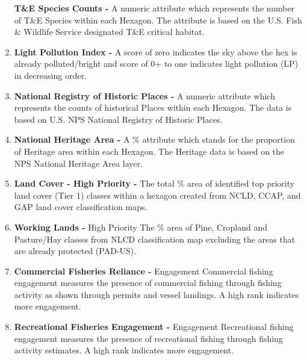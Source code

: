 \documentclass[]{article}
\begin{document}
\begin{enumerate}
  \textbf{T\&E Species Counts -} A numeric attribute which represents
  the number of T\&E Species within each Hexagon. The attribute is based
  on the U.S. Fish \& Wildlife Service designated T\&E critical habitat.
\item
  \textbf{Light Pollution Index -} A score of zero indicates the sky
  above the hex is already polluted/bright and score of 0+ to one
  indicates light pollution (LP) in decreasing order.
\item
  \textbf{National Registry of Historic Places -} A numeric attribute
  which represents the counts of historical Places within each Hexagon.
  The data is based on U.S. NPS National Registry of Historic Places.
\item
  \textbf{National Heritage Area -} A \% attribute which stands for the
  proportion of Heritage area within each Hexagon. The Heritage data is
  based on the NPS National Heritage Area layer.
\item
  \textbf{Land Cover - High Priority -} The total \% area of identified
  top priority land cover (Tier 1) classes within a hexagon created from
  NCLD, CCAP, and GAP land cover classification maps.
\item
  \textbf{Working Lands -} High Priority The \% area of Pine, Cropland
  and Pasture/Hay classes from NLCD classification map excluding the
  areas that are already protected (PAD-US).
\item
  \textbf{Commercial Fisheries Reliance -} Engagement Commercial fishing
  engagement measures the presence of commercial fishing through fishing
  activity as shown through permits and vessel landings. A high rank
  indicates more engagement.
\item
  \textbf{Recreational Fisheries Engagement -} Engagement Recreational
  fishing engagement measures the presence of recreational fishing
  through fishing activity estimates. A high rank indicates more
  engagement.
\end{enumerate}
\end{document}
